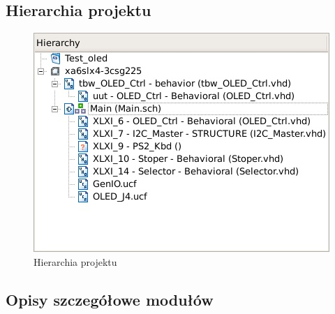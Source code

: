 \documentclass[]{article}
\begin{document}
	\subsection{Hierarchia projektu}
	\begin{figure}[H]
		\includegraphics[width=\linewidth]{img/hierarchy.jpg}
		\caption{Hierarchia projektu}
		\label{fig:hierarchy}
	\end{figure}
	
	\subsection{Opisy szczegółowe modułów}
\end{document}
